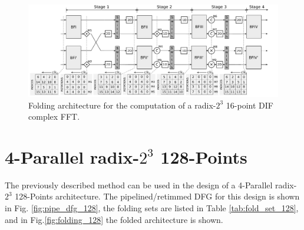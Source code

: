 \documentclass[10pt,times,mathptm,psfig,final,journal,comsoc]{IEEEtran}
\begin{document}
\begin{figure} 
	\centering
	\includegraphics[width=0.85\linewidth]{Diagramas/folding-16.pdf}%
	\caption{Folding architecture for the computation of a radix-$2^3$ 16-point DIF complex FFT.}
	\label{fig:folding_16_arch}
\end{figure}



\section{4-Parallel radix-$2^3$ 128-Points}   \label{sec:imp128}
The previously described method can be used in the design of a 4-Parallel radix-$2^3$ 128-Points architecture. 
The pipelined/retimmed  DFG for this design is shown in Fig. \ref{fig:pipe_dfg_128}, the folding sets are listed in Table \ref{tab:fold_set_128}, and in Fig.\ref{fig:folding_128}  the folded architecture is shown.

\begin{small}

\end{small}
\end{document}
